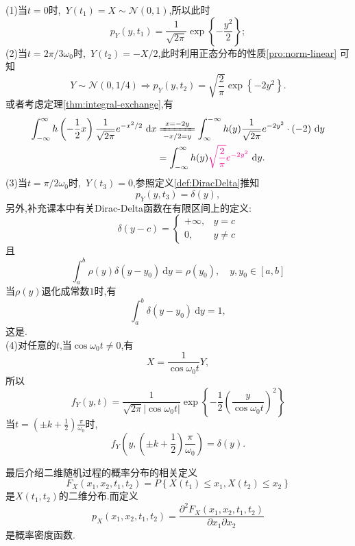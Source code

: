 \documentclass[cn,10pt,citestyle=gb7714-2015,bibstyle=gb7714-2015]{elegantbook}
\newcommand{\md}{\ \mathrm{d}}
\begin{document}
\begin{solution}
  (1)当$t=0$时,\ $Y(t_1)=X\sim\mathcal{N}(0,1)$,所以此时
  \[
      p_Y(y,t_1)=\frac{1}{\sqrt{2\pi}}\exp\left\{-\frac{y^2}{2}\right\};
  \]
  (2)当$t=2\pi/3\omega_0$时,\ $Y(t_2)=-X/2$,此时利用正态分布的性质\ref{pro:norm-linear}
  可知
  \[
      Y\sim\mathcal{N}(0,1/4)\Rightarrow p_Y(y,t_2)=\sqrt{\frac{2}{\pi}}\exp\left\{-2y^2\right\}.
  \]
  或者考虑定理\ref{thm:integral-exchange},有
  \begin{align*}
    \int_{-\infty}^\infty h\left(-\frac12x\right)\frac{1}{\sqrt{2\pi}}e^{-x^2/2}\md x&\xlongequal[-x/2=y]{x=-2y}\int_{\infty}^{-\infty}h(y)\frac{1}{\sqrt{2\pi}}e^{-2y^2}\cdot(-2)\md y\\
    &=\int_{-\infty}^\infty h(y)\textcolor{magenta}{\sqrt{\frac{2}{\pi}}e^{-2y^2}}\md y.
  \end{align*}
  (3)当$t=\pi/2\omega_0$时,\ $Y(t_3)=0$,参照定义\ref{def:DiracDelta}推知
  \[
      p_Y(y,t_3)=\delta(y),
  \]
  另外,补充课本中有关\textup{Dirac-Delta}函数在有限区间上的定义:
  \begin{equation}
    \delta(y-c)=\begin{cases}
      +\infty,&y=c\\
      0,&y\neq c
    \end{cases}
  \end{equation}
  且
  \begin{equation}
    \int_a^b\rho(y)\delta(y-y_0)\md y=\rho(y_0),\quad y,y_0\in[a,b]
  \end{equation}
  当$\rho(y)$退化成常数$1$时,有
  \begin{equation}
    \int_a^b\delta(y-y_0)\md y=1,
  \end{equation}
  这是.\\
  (4)对任意的$t$,当$\cos\omega_0 t\neq 0$,有
  \[
      X=\frac{1}{\cos\omega_0t}Y,
  \]
  所以
  \[
      f_Y(y,t)=\frac{1}{\sqrt{2\pi}|\cos\omega_0t|}\exp\left\{-\frac12\left(\frac{y}{\cos\omega_0t}\right)^2\right\}
  \]
  当$t=(\pm k+\frac12)\frac{\pi}{\omega_0}$时,
  \[
      f_Y\left(y,\left(\pm k+\frac12\right)\frac{\pi}{\omega_0}\right)=\delta(y).
  \]
\end{solution}
最后介绍二维随机过程的概率分布的相关定义
\begin{equation}
  F_X(x_1,x_2,t_1,t_2)=P\left\{X(t_1)\leqslant x_1,X(t_2)\leqslant x_2\right\}
\end{equation}
是$X(t_1,t_2)$的二维分布.而定义
\begin{equation}
  p_X(x_1,x_2,t_1,t_2)=\frac{\partial^2F_X(x_1,x_2,t_1,t_2)}{\partial x_1\partial x_2}
\end{equation}
是概率密度函数.
\end{document}
